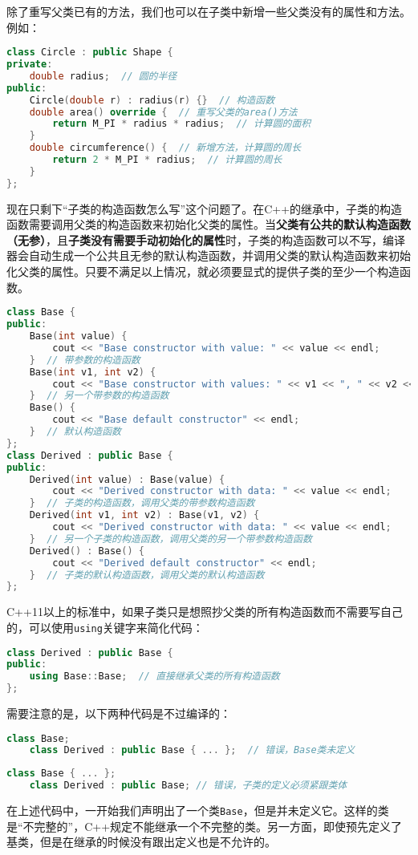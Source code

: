 除了重写父类已有的方法，我们也可以在子类中新增一些父类没有的属性和方法。例如：
\begin{lstlisting}[language=C++]
class Circle : public Shape {
private:
    double radius;  // 圆的半径
public:
    Circle(double r) : radius(r) {}  // 构造函数
    double area() override {  // 重写父类的area()方法
        return M_PI * radius * radius;  // 计算圆的面积
    }
    double circumference() {  // 新增方法，计算圆的周长
        return 2 * M_PI * radius;  // 计算圆的周长
    }
};
\end{lstlisting}

现在只剩下“子类的构造函数怎么写”这个问题了。在C++的继承中，子类的构造函数需要调用父类的构造函数来初始化父类的属性。当\textbf{父类有公共的默认构造函数（无参）}，且\textbf{子类没有需要手动初始化的属性}时，子类的构造函数可以不写，编译器会自动生成一个公共且无参的默认构造函数，并调用父类的默认构造函数来初始化父类的属性。只要不满足以上情况，就必须要显式的提供子类的至少一个构造函数。
\begin{lstlisting}[language=C++]
class Base {
public:
    Base(int value) {
        cout << "Base constructor with value: " << value << endl;
    }  // 带参数的构造函数
    Base(int v1, int v2) {
        cout << "Base constructor with values: " << v1 << ", " << v2 << endl;
    }  // 另一个带参数的构造函数
    Base() {
        cout << "Base default constructor" << endl;
    }  // 默认构造函数
};
class Derived : public Base {
public:
    Derived(int value) : Base(value) {
        cout << "Derived constructor with data: " << value << endl;
    }  // 子类的构造函数，调用父类的带参数构造函数
    Derived(int v1, int v2) : Base(v1, v2) {
        cout << "Derived constructor with data: " << value << endl;
    }  // 另一个子类的构造函数，调用父类的另一个带参数构造函数
    Derived() : Base() {
        cout << "Derived default constructor" << endl;
    }  // 子类的默认构造函数，调用父类的默认构造函数
};
\end{lstlisting}

C++11以上的标准中，如果子类只是想照抄父类的所有构造函数而不需要写自己的，可以使用\texttt{using}关键字来简化代码：
\begin{lstlisting}[language=C++]
class Derived : public Base {
public:
    using Base::Base;  // 直接继承父类的所有构造函数
};
\end{lstlisting}

需要注意的是，以下两种代码是不过编译的：
\begin{lstlisting}[language=C++]
    class Base;
    class Derived : public Base { ... };  // 错误，Base类未定义
\end{lstlisting}
\begin{lstlisting}[language=C++]
    class Base { ... };
    class Derived : public Base; // 错误，子类的定义必须紧跟类体
\end{lstlisting}
在上述代码中，一开始我们声明出了一个类\texttt{Base}，但是并未定义它。这样的类是“不完整的”，C++规定不能继承一个不完整的类。另一方面，即使预先定义了基类，但是在继承的时候没有跟出定义也是不允许的。

